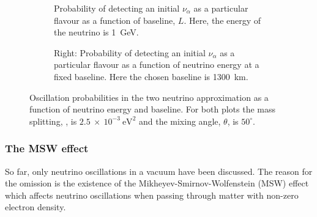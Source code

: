 \begin{figure}[h]
  \centering
  \begin{subfigure}[t]{0.49\textwidth}
    \begin{adjustbox}{max totalsize={\textwidth}, center}
      
    \end{adjustbox}
    \caption{Probability of detecting an initial $\nu_{\alpha}$ as a particular flavour as a function of baseline, $L$. Here, the energy of the neutrino is 1~GeV.}
  \end{subfigure}
  \hfill
  \begin{subfigure}[t]{0.49\textwidth}
    \begin{adjustbox}{max totalsize={\textwidth}, center}
      
    \end{adjustbox}
    \caption{Right: Probability of detecting an initial $\nu_{\alpha}$ as a particular flavour as a function of neutrino energy at a fixed baseline. Here the chosen baseline is 1300~km.}
  \end{subfigure}
  \caption{Oscillation probabilities in the two neutrino approximation as a function of neutrino energy and baseline. For both plots the mass splitting, \deltam{}{}, is $2.5~\times~10^{-3}~\text{eV}^{2}$ and the mixing angle, $\theta$, is $50^{\circ}$.}
  \label{fig:twoNeutrino}
\end{figure}

\subsubsection{The MSW effect}
\label{sec:theory:theory:msw}
So far, only neutrino oscillations in a vacuum have been discussed.
The reason for the omission is the existence of the Mikheyev-Smirnov-Wolfenstein (MSW) effect which affects neutrino oscillations when passing through matter with non-zero electron density.

